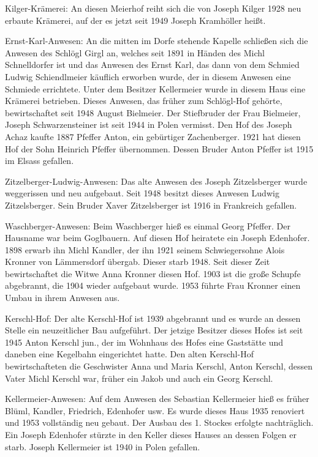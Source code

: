 \documentclass{book}
\begin{document}
Kilger-Krämerei: An diesen Meierhof reiht sich die von Joseph Kilger 1928 neu
erbaute Krämerei, auf der es jetzt seit 1949 Joseph Kramhöller heißt.

Ernst-Karl-Anwesen: An die mitten im Dorfe stehende Kapelle schließen sich die
Anwesen des Schlögl Girgl an, welches seit 1891 in Händen des Michl
Schnelldorfer ist und das Anwesen des Ernst Karl, das dann von dem Schmied
Ludwig Schiendlmeier käuflich erworben wurde, der in diesem Anwesen eine
Schmiede errichtete. Unter dem Besitzer Kellermeier wurde in diesem Haus eine
Krämerei betrieben. Dieses Anwesen, das früher zum Schlögl-Hof gehörte,
bewirtschaftet seit 1948 August Bielmeier. Der Stiefbruder der Frau Bielmeier,
Joseph Schwarzensteiner ist seit 1944 in Polen vermisst. Den Hof des Joseph
Achaz kaufte 1887 Pfeffer Anton, ein gebürtiger Zachenberger. 1921 hat diesen
Hof der Sohn Heinrich Pfeffer übernommen. Dessen Bruder Anton Pfeffer ist 1915
im Elsass gefallen.

Zitzelberger-Ludwig-Anwesen: Das alte Anwesen des Joseph Zitzelsberger wurde
weggerissen und neu aufgebaut. Seit 1948 besitzt dieses Anwesen Ludwig
Zitzelsberger. Sein Bruder Xaver Zitzelsberger ist 1916 in Frankreich gefallen.

Waschberger-Anwesen: Beim Waschberger hieß es einmal Georg Pfeffer. Der Hausname
war beim Goglbauern. Auf diesen Hof heiratete ein Joseph Edenhofer. 1898 erwarb
ihn Michl Kandler, der ihn 1921 seinem Schwiegersohne Alois Kronner von
Lämmersdorf übergab. Dieser starb 1948. Seit dieser Zeit bewirtschaftet die
Witwe Anna Kronner diesen Hof. 1903 ist die große Schupfe abgebrannt, die 1904
wieder aufgebaut wurde. 1953 führte Frau Kronner einen Umbau in ihrem Anwesen
aus.

Kerschl-Hof: Der alte Kerschl-Hof ist 1939 abgebrannt und es wurde an dessen
Stelle ein neuzeitlicher Bau aufgeführt. Der jetzige Besitzer dieses Hofes ist
seit 1945 Anton Kerschl jun., der im Wohnhaus des Hofes eine Gaststätte und
daneben eine Kegelbahn eingerichtet hatte. Den alten Kerschl-Hof
bewirtschafteten die Geschwister Anna und Maria Kerschl, Anton Kerschl, dessen
Vater Michl Kerschl war, früher ein Jakob und auch ein Georg Kerschl.

Kellermeier-Anwesen: Auf dem Anwesen des Sebastian Kellermeier hieß es früher
Blüml, Kandler, Friedrich, Edenhofer usw. Es wurde dieses Haus 1935 renoviert
und 1953 vollständig neu gebaut. Der Ausbau des 1. Stockes erfolgte
nachträglich. Ein Joseph Edenhofer stürzte in den Keller dieses Hauses an dessen
Folgen er starb. Joseph Kellermeier ist 1940 in Polen gefallen.
\end{document}
